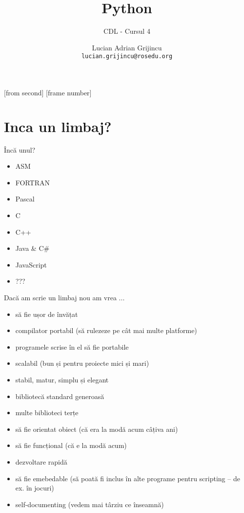 \documentclass{beamer}
\title[Python]{Python}
\subtitle{CDL - Cursul 4}
\institute{ROSEdu}
\author{Lucian Adrian Grijincu \\ 
  \texttt{lucian.grijincu@rosedu.org}}
\begin{document}
[from second]
[frame number]

\frame{\titlepage}

\frame{\tableofcontents}

\section{Inca un limbaj?}

\frame{\tableofcontents[currentsection]}


\begin{frame}{Încă unul?}
  \begin{itemize}
  \item ASM
  \item FORTRAN %
  \item Pascal
  \item C
  \item C++
  \item Java \& C\#
  \item JavaScript
  \item ???
  \end{itemize}
\end{frame}


\begin{frame}{Dacă am scrie un limbaj nou am vrea ...}
  \begin{itemize}[<+->]
  \item să fie ușor de învățat
  \item compilator portabil (să rulezeze pe cât mai multe platforme)
  \item programele scrise în el să fie portabile
  \item scalabil (bun și pentru proiecte mici și mari)
  \item stabil, matur, simplu și elegant
  \item bibliotecă standard generoasă
  \item multe biblioteci terțe
  \item să fie orientat obiect (că era la modă acum câțiva ani)
  \item să fie funcțional (că e la modă acum)
  \item dezvoltare rapidă
  \item să fie emebedable (să poată fi inclus în alte programe
    pentru scripting – de ex. în jocuri)
  \item self-documenting (vedem mai târziu ce înseamnă)
  \end{itemize}
\end{frame}
\end{document}
